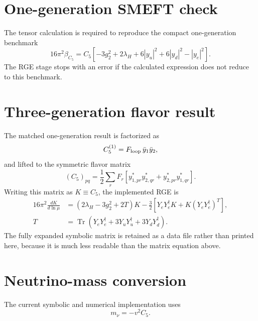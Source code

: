 \documentclass[10pt]{article}
\begin{document}
\section{One-generation SMEFT check}
The tensor calculation is required to reproduce the compact one-generation benchmark
\begin{equation}
16\pi^2\beta_{C_5}=C_5\left[
-3g_2^2+2\lambda_H+6|y_u|^2+6|y_d|^2-|y_e|^2
\right].
\end{equation}
The RGE stage stops with an error if the calculated expression does not reduce to this benchmark.
\section{Three-generation flavor result}
The matched one-generation result is factorized as
\begin{equation*}
C_5^{(1)}=F_{\rm loop}\,\bar y_1\bar y_2,
\end{equation*}
and lifted to the symmetric flavor matrix
\begin{equation}
(C_5)_{pq}=\frac12\sum_r F_r\left[
y_{1,pr}^*y_{2,qr}^*+y_{2,pr}^*y_{1,qr}^*
\right].
\end{equation}
Writing this matrix as $K\equiv C_5$, the implemented RGE is
\begin{align}
16\pi^2\frac{dK}{d\ln\mu}
&=(2\lambda_H-3g_2^2+2T)K
-\frac32\left[Y_eY_e^\dagger K+K(Y_eY_e^\dagger)^T\right],\\
T&=\operatorname{Tr}\!\left(
Y_eY_e^\dagger+3Y_uY_u^\dagger+3Y_dY_d^\dagger
\right).
\end{align}
The fully expanded symbolic matrix is retained as a data file rather than printed here, because it is much less readable than the matrix equation above.
\section{Neutrino-mass conversion}
The current symbolic and numerical implementation uses
\begin{equation}
m_\nu=-v^2C_5.
\end{equation}
\begin{center}
\end{center}
\end{document}
